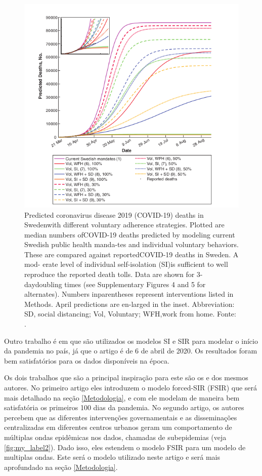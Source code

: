 \documentclass{article}
\begin{document}
\begin{figure}[H]
    \centering
    \includegraphics[scale=0.6]{corona.png}
    \caption{Predicted  coronavirus  disease  2019  (COVID-19)  deaths  in  Swedenwith different voluntary adherence strategies.  Plotted are median numbers ofCOVID-19 deaths predicted by modeling current Swedish public health manda-tes and individual voluntary behaviors.  These are compared against reportedCOVID-19 deaths in Sweden.  A mod- erate level of individual self-isolation (SI)is sufficient to well reproduce the reported death tolls.  Data are shown for 3-daydoubling times (see Supplementary Figures 4 and 5 for alternates).  Numbers inparentheses represent interventions listed in Methods.  April predictions are en-larged in the inset.  Abbreviation:  SD, social distancing; Vol, Voluntary; WFH,work from home.  Fonte: \citep{managing}.}
    \label{fig:my_label}
\end{figure}

Outro trabalho é \citep{modelstudies} em que são utilizados os modelos SI e SIR para modelar o início da pandemia no país, já que o artigo é de 6 de abril de 2020. Os resultados foram bem satisfatórios para os dados disponíveis na época.

Os dois trabalhos que são a principal inspiração para este são os \citep{thefirst100days} e \citep{multiwave} dos mesmos autores. No primeiro artigo eles introduzem o modelo forced-SIR (FSIR) que será mais detalhado na seção \ref{Metodologia}, e com ele modelam de maneira bem satisfatória os primeiros 100 dias da pandemia. No segundo artigo, os autores percebem que as diferentes intervenções governamentais e as disseminações centralizadas em diferentes centros urbanos geram um comportamento de múltiplas ondas epidêmicas nos dados, chamadas de subepidemias (veja \ref{fig:my_label2}). Dado isso, eles estendem o modelo FSIR para um modelo de multiplas ondas. Este será o modelo utilizado neste artigo e será mais aprofundado na seção \ref{Metodologia}.
\end{document}
